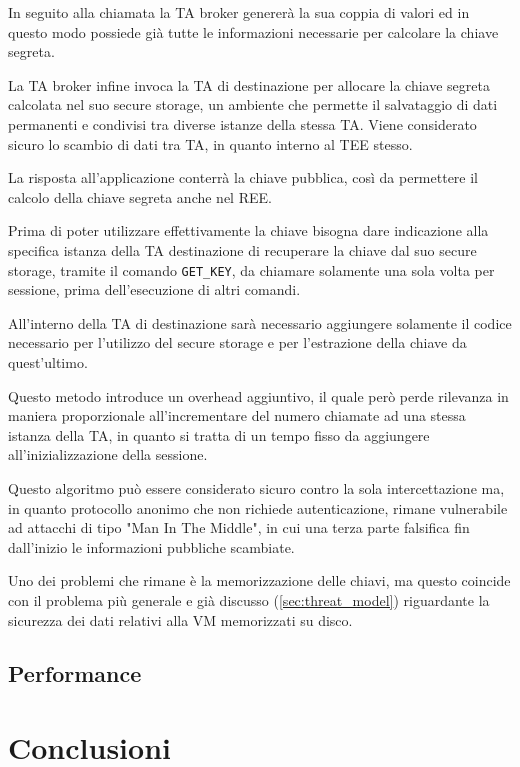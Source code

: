 \documentclass[12pt,italian]{report}
\begin{document}
	In seguito alla chiamata la TA broker genererà la sua coppia di valori ed in questo modo possiede già tutte le informazioni necessarie per calcolare la chiave segreta. 
	
	La TA broker infine invoca la TA di destinazione per allocare la chiave segreta calcolata nel suo secure storage, un ambiente che permette il salvataggio di dati permanenti e condivisi tra diverse istanze della stessa TA. Viene considerato sicuro lo scambio di dati tra TA, in quanto interno al TEE stesso.
	
	La risposta all'applicazione conterrà la chiave pubblica, così da permettere il calcolo della chiave segreta anche nel REE.
	
	Prima di poter utilizzare effettivamente la chiave bisogna dare indicazione alla specifica istanza della TA destinazione di recuperare la chiave dal suo secure storage, tramite il comando \texttt{GET\_KEY}, da chiamare solamente una sola volta per sessione, prima dell'esecuzione di altri comandi.
	
	\bigbreak 
	
	All'interno della TA di destinazione sarà necessario aggiungere solamente il codice necessario per l'utilizzo del secure storage e per l'estrazione della chiave da quest'ultimo.
	
	\bigbreak
	
	Questo metodo introduce un overhead aggiuntivo, il quale però perde rilevanza in maniera proporzionale all'incrementare del numero chiamate ad una stessa istanza della TA, in quanto si tratta di un tempo fisso da aggiungere all'inizializzazione della sessione. 
	
	\bigbreak
	
	Questo algoritmo può essere considerato sicuro contro la sola intercettazione ma, in quanto protocollo anonimo che non richiede autenticazione, rimane vulnerabile ad attacchi di tipo "Man In The Middle", in cui una terza parte falsifica fin dall'inizio le informazioni pubbliche scambiate.
	
	\bigbreak
	
	Uno dei problemi che rimane è la memorizzazione delle chiavi, ma questo coincide con il problema più generale e già discusso (\ref{sec:threat_model}) riguardante la sicurezza dei dati relativi alla VM memorizzati su disco.
	
	\newpage
	
	\section{Performance}
	\label{sec:dati}
	
	\chapter{Conclusioni}
	\label{cap:conclusioni}
	
	
	
	
\end{document}
